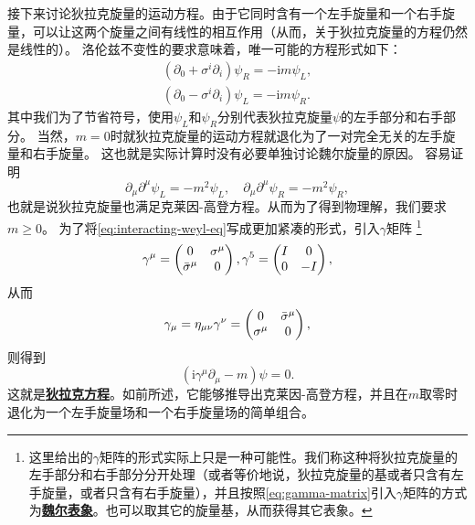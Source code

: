 \documentclass[hyperref, UTF8, a4paper]{ctexart}
\newcommand*{\ii}{\mathrm{i}}
\newcommand{\concept}[1]{\underline{\textbf{#1}}}
\begin{document}
接下来讨论狄拉克旋量的运动方程。由于它同时含有一个左手旋量和一个右手旋量，可以让这两个旋量之间有线性的相互作用（从而，关于狄拉克旋量的方程仍然是线性的）。
洛伦兹不变性的要求意味着，唯一可能的方程形式如下：
\begin{equation}
    \begin{aligned}
        (\partial_0 + \sigma^i \partial_i) \psi_R = - \ii m \psi_L, \\
        (\partial_0 - \sigma^i \partial_i) \psi_L = - \ii m \psi_R.
    \end{aligned}
    \label{eq:interacting-weyl-eq}
\end{equation}
其中我们为了节省符号，使用$\psi_L$和$\psi_R$分别代表狄拉克旋量$\psi$的左手部分和右手部分。
当然，$m=0$时就狄拉克旋量的运动方程就退化为了一对完全无关的左手旋量和右手旋量。
这也就是实际计算时没有必要单独讨论魏尔旋量的原因。
容易证明
\[
    \partial_\mu \partial^\mu \psi_L = - m^2 \psi_L, \quad \partial_\mu \partial^\mu \psi_R = - m^2 \psi_R,
\]
也就是说狄拉克旋量也满足克莱因-高登方程。从而为了得到物理解，我们要求$m \geq 0$。
为了将\eqref{eq:interacting-weyl-eq}写成更加紧凑的形式，引入$\gamma$矩阵%
\footnote{这里给出的$\gamma$矩阵的形式实际上只是一种可能性。我们称这种将狄拉克旋量的左手部分和右手部分分开处理（或者等价地说，狄拉克旋量的基或者只含有左手旋量，或者只含有右手旋量），并且按照\eqref{eq:gamma-matrix}引入$\gamma$矩阵的方式为\concept{魏尔表象}。也可以取其它的旋量基，从而获得其它表象。}
\begin{equation}
    \gamma^\mu = \pmqty{0 & \sigma^\mu \\ \bar{\sigma}^\mu & 0}, \gamma^5 = \pmqty{I & 0 \\ 0 & -I},
    \label{eq:gamma-matrix}
\end{equation}
从而
\begin{equation}
    \gamma_\mu = \eta_{\mu \nu} \gamma^\nu = \pmqty{ 0 & \bar{\sigma}^\mu \\ \sigma^\mu & 0 },
\end{equation}
则得到
\begin{equation}
    (\ii \gamma^\mu \partial_\mu - m) \psi = 0.
    \label{eq:dirac-eq}
\end{equation}
这就是\concept{狄拉克方程}。如前所述，它能够推导出克莱因-高登方程，并且在$m$取零时退化为一个左手旋量场和一个右手旋量场的简单组合。
\end{document}
